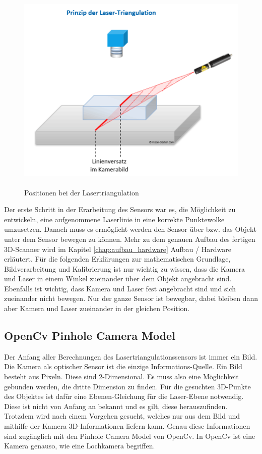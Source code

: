 	\begin{figure}[h]
		\centering
		\includegraphics[height=10cm]{img/grundlagen/lasertriangulation_2}
		\caption{Positionen bei der Lasertriangulation}
		\label{lasertriangulation}
	\end{figure}
	
	Der erste Schritt in der Erarbeitung des Sensors war es, die Möglichkeit zu entwickeln, eine aufgenommene Laserlinie in eine korrekte Punktewolke umzusetzen. Danach muss es ermöglicht werden den Sensor über bzw. das Objekt unter dem Sensor bewegen zu können. Mehr zu dem genauen Aufbau des fertigen 3D-Scanner wird im Kapitel \ref{chap:aufbau_hardware} Aufbau / Hardware erläutert. Für die folgenden Erklärungen zur mathematischen Grundlage, Bildverarbeitung und Kalibrierung ist nur wichtig zu wissen, dass die Kamera und Laser in einem Winkel zueinander über dem Objekt angebracht sind. Ebenfalls ist wichtig, dass Kamera und Laser fest angebracht sind und sich zueinander nicht bewegen. Nur der ganze Sensor ist bewegbar, dabei bleiben dann aber Kamera und Laser zueinander in der gleichen Position.
	\label{chap:grundlegender_aufbau}
	
	\subsection{OpenCv Pinhole Camera Model}
	Der Anfang aller Berechnungen des Lasertriangulationssensors ist immer ein Bild. Die Kamera als optischer Sensor ist die einzige Informations-Quelle. Ein Bild besteht aus Pixeln. Diese sind 2-Dimensional. Es muss also eine Möglichkeit gebunden werden, die dritte Dimension zu finden. Für die gesuchten 3D-Punkte des Objektes ist dafür eine Ebenen-Gleichung für die Laser-Ebene notwendig. Diese ist nicht von Anfang an bekannt und es gilt, diese herauszufinden. Trotzdem wird nach einem Vorgehen gesucht, welches nur aus dem Bild und mithilfe der Kamera 3D-Informationen liefern kann. Genau diese Informationen sind zugänglich mit den Pinhole Camera Model von OpenCv. In OpenCv ist eine Kamera genauso, wie eine Lochkamera begriffen.
	
